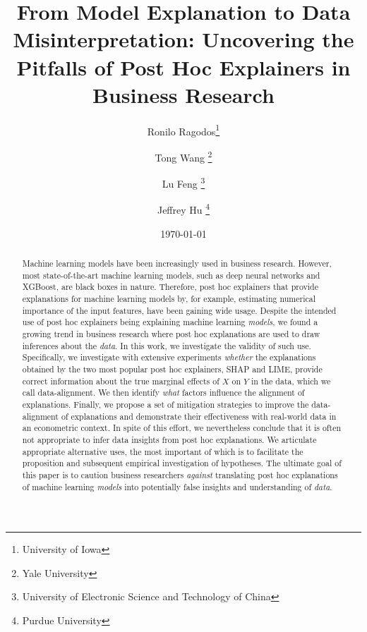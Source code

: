 \documentclass[12pt]{article}  %
\begin{document}



\begin{titlepage}
\title{From Model Explanation to Data Misinterpretation: Uncovering the Pitfalls of Post Hoc Explainers in Business Research}
\author{Ronilo Ragodos\thanks{University of Iowa} \and Tong Wang \thanks{Yale University} \and Lu Feng \thanks{University of Electronic Science and Technology of China} \and Jeffrey Hu \thanks{Purdue University}}
\date{\today}
\maketitle
\begin{abstract}
\noindent Machine learning models have been increasingly used in business research. However, most state-of-the-art machine learning models, such as deep neural networks and XGBoost, are black boxes in nature. Therefore, post hoc explainers that provide explanations for machine learning models by, for example, estimating numerical importance of the input features, have been gaining wide usage. Despite the intended use of post hoc explainers being explaining machine learning \textit{models}, we found a growing trend in business research where post hoc explanations are used to draw inferences about the \textit{data}. In this work, we investigate the validity of such use. Specifically, we investigate with extensive experiments \emph{whether} the explanations obtained by the two most popular post hoc explainers, SHAP and LIME, provide correct information about the true marginal effects of $X$ on $Y$ in the data, which we call data-alignment. We then identify \emph{what} factors influence the alignment of explanations. Finally, we propose a set of mitigation strategies to improve the data-alignment of explanations and demonstrate their effectiveness with real-world data in an econometric context. In spite of this effort, we nevertheless conclude that it is often not appropriate to infer data insights from  post hoc explanations. We articulate appropriate alternative uses, the most important of which is to facilitate the proposition and subsequent empirical investigation of hypotheses. The ultimate goal of this paper is to caution business researchers \textit{against} translating post hoc explanations of machine learning \textit{models} into potentially false insights and understanding of \textit{data}.

\end{abstract}
\end{titlepage}
\end{document}
